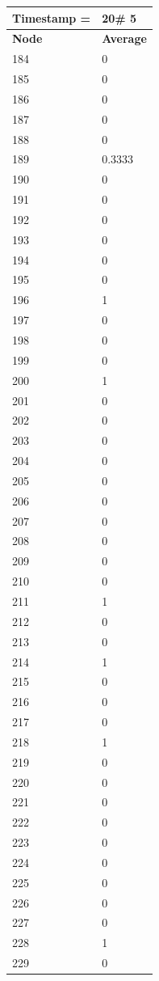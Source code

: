 \begin{tabular}{|l||l|}
\hline
\textbf{Timestamp =} & \textbf{20}\# 5\\\hline
	\textbf{Node} & \textbf{Average} \\ \hline
\hline
	184 & 0 \\ \hline
	185 & 0 \\ \hline
	186 & 0 \\ \hline
	187 & 0 \\ \hline
	188 & 0 \\ \hline
	189 & 0.3333 \\ \hline
	190 & 0 \\ \hline
	191 & 0 \\ \hline
	192 & 0 \\ \hline
	193 & 0 \\ \hline
	194 & 0 \\ \hline
	195 & 0 \\ \hline
	196 & 1 \\ \hline
	197 & 0 \\ \hline
	198 & 0 \\ \hline
	199 & 0 \\ \hline
	200 & 1 \\ \hline
	201 & 0 \\ \hline
	202 & 0 \\ \hline
	203 & 0 \\ \hline
	204 & 0 \\ \hline
	205 & 0 \\ \hline
	206 & 0 \\ \hline
	207 & 0 \\ \hline
	208 & 0 \\ \hline
	209 & 0 \\ \hline
	210 & 0 \\ \hline
	211 & 1 \\ \hline
	212 & 0 \\ \hline
	213 & 0 \\ \hline
	214 & 1 \\ \hline
	215 & 0 \\ \hline
	216 & 0 \\ \hline
	217 & 0 \\ \hline
	218 & 1 \\ \hline
	219 & 0 \\ \hline
	220 & 0 \\ \hline
	221 & 0 \\ \hline
	222 & 0 \\ \hline
	223 & 0 \\ \hline
	224 & 0 \\ \hline
	225 & 0 \\ \hline
	226 & 0 \\ \hline
	227 & 0 \\ \hline
	228 & 1 \\ \hline
	229 & 0 \\ \hline
\end{tabular}
